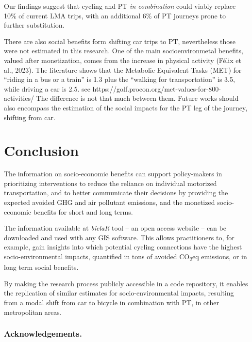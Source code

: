 \documentclass[review, doubleblind, 3p,
authoryear]{elsarticle} %
\begin{document}
Our findings suggest that cycling and PT \emph{in combination} could
viably replace 10\% of current LMA trips, with an additional 6\% of PT
journeys prone to further substitution.

There are also social benefits form shifting car trips to PT,
nevertheless those were not estimated in this research. One of the main
socioenvironmetal benefits, valued after monetization, comes from the
increase in physical activity (Félix et al., 2023). The literature shows
that the Metabolic Equivalent Tasks (MET) for ``riding in a bus or a
train'' is 1.3 plus the ``walking for transportation'' is 3.5, while
driving a car is 2.5. see
https://golf.procon.org/met-values-for-800-activities/ The difference is
not that much between them. Future works should also encompass the
estimation of the social impacts for the PT leg of the journey, shifting
from car.

\hypertarget{conclusion}{%
\section{Conclusion}\label{conclusion}}

The information on socio-economic benefits can support policy-makers in
prioritizing interventions to reduce the reliance on individual
motorized transportation, and to better communicate their decisions by
providing the expected avoided GHG and air pollutant emissions, and the
monetized socio-economic benefits for short and long terms.

The information available at \emph{biclaR} tool -- an open access
website -- can be downloaded and used with any GIS software. This allows
practitioners to, for example, gain insights into which potential
cycling connections have the highest socio-environmental impacts,
quantified in tons of avoided CO\textsubscript{2}eq emissions, or in
long term social benefits.

By making the research process publicly accessible in a code repository,
it enables the replication of similar estimates for socio-environmental
impacts, resulting from a modal shift from car to bicycle in combination
with PT, in other metropolitan areas.

\hypertarget{acknowledgements.}{%
\subsubsection*{Acknowledgements.}\label{acknowledgements.}}
\end{document}
